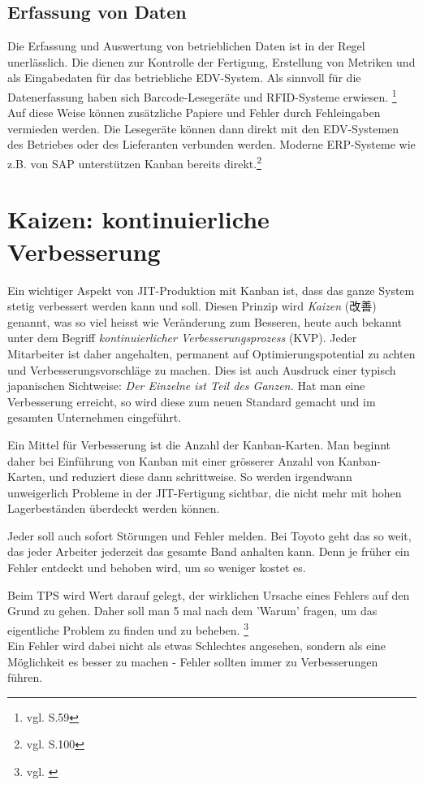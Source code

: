 \subsection{Erfassung von Daten}
Die Erfassung und Auswertung von betrieblichen Daten ist in der Regel unerlässlich.
Die dienen zur Kontrolle der Fertigung, Erstellung von Metriken und als Eingabedaten für das betriebliche EDV-System.
Als sinnvoll für die Datenerfassung haben sich Barcode-Lesegeräte und RFID-Systeme erwiesen. \footnote{vgl. \cite{Geiger2011Kanban} S.59}
Auf diese Weise können zusätzliche Papiere und Fehler durch Fehleingaben vermieden werden.
Die Lesegeräte können dann direkt mit den EDV-Systemen des Betriebes oder des Lieferanten verbunden werden.
Moderne ERP-Systeme wie z.B. von SAP unterstützen Kanban bereits direkt.\footnote{vgl. \cite{Weber2014KE} S.100}

\section{Kaizen: kontinuierliche Verbesserung}
Ein wichtiger Aspekt von JIT-Produktion mit Kanban ist, dass das ganze System stetig verbessert werden kann und soll.
Diesen Prinzip wird \emph{Kaizen} ({\CN 改善}) genannt, was so viel heisst wie Veränderung zum Besseren, 
heute auch bekannt unter dem Begriff \emph{kontinuierlicher Verbesserungsprozess} (KVP).
Jeder Mitarbeiter ist daher angehalten, permanent auf Optimierungspotential zu achten und Verbesserungsvorschläge zu machen.
Dies ist auch Ausdruck einer typisch japanischen Sichtweise: \emph{Der Einzelne ist Teil des Ganzen.}
Hat man eine Verbesserung erreicht, so wird diese zum neuen Standard gemacht und im gesamten Unternehmen eingeführt.

Ein Mittel für Verbesserung ist die Anzahl der Kanban-Karten.
Man beginnt daher bei Einführung von Kanban mit einer grösserer Anzahl von Kanban-Karten, und reduziert diese dann schrittweise.
So werden irgendwann unweigerlich Probleme in der JIT-Fertigung sichtbar, die nicht mehr mit hohen Lagerbeständen überdeckt werden können.

Jeder soll auch sofort Störungen und Fehler melden. 
Bei Toyoto geht das so weit, das jeder Arbeiter jederzeit das gesamte Band anhalten kann.
Denn je früher ein Fehler entdeckt und behoben wird, um so weniger kostet es.

Beim TPS  wird Wert darauf gelegt, der wirklichen Ursache eines Fehlers auf den Grund zu gehen.
Daher soll man 5 mal nach dem 'Warum' fragen, um das eigentliche Problem zu finden und zu beheben. \footnote{vgl. \cite{Toyota} }\\
Ein Fehler wird dabei nicht als etwas Schlechtes angesehen, sondern als eine Möglichkeit es besser zu machen - Fehler sollten immer zu Verbesserungen führen.

